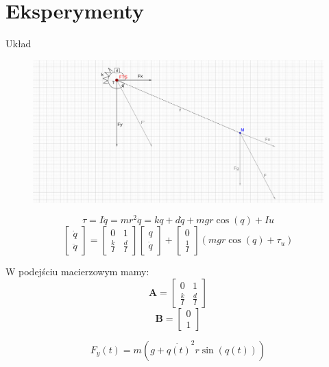 \documentclass{beamer}
\begin{document}
\section{Eksperymenty}
\begin{frame}[allowframebreaks]{Układ}
\begin{figure}[h]
	\centering
	\includegraphics[scale=1.30]{2d}
\end{figure}
\framebreak
\begin{equation}
	\tau = I\ddot{q} = mr^2\ddot{q} = kq + d\dot{q} + mgr\cos{(q)} + Iu
\end{equation}
\begin{equation}
	\begin{bmatrix}
	    \dot{q} \\
	    \ddot{q}
	\end{bmatrix}
	=
	\begin{bmatrix}
	    0 & 1 \\
	    \frac{k}{I} & \frac{d}{I}
	\end{bmatrix}
	\begin{bmatrix}
		q \\
	    \dot{q}
	\end{bmatrix}
	+
	\begin{bmatrix}
	    0 \\
	    \frac{1}{I}
	\end{bmatrix}
	(mgr\cos{(q)} + \tau_u)
\end{equation}

W podejściu macierzowym mamy:
\begin{equation}
\mathbf{A} = 	\begin{bmatrix}
	    0 & 1 \\
	    \frac{k}{I} & \frac{d}{I}
	\end{bmatrix}
\end{equation}
\begin{equation}
\mathbf{B} = \begin{bmatrix}
	    0 \\
	    1
	\end{bmatrix}
\end{equation}

\begin{equation}
F_{y}(t)  = m(g + \dot{q(t)}^2r\sin{(q(t))})
\end{equation}

\end{frame}
\end{document}
